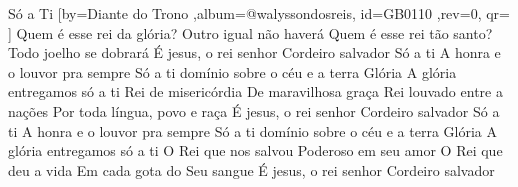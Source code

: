 \beginsong
{Só a Ti %
}[by={Diante do Trono %
},album={@walyssondosreis},
id={GB0110 %
},rev={0}, %
qr={ %
}]
\beginverse*
Quem é esse rei da glória?
Outro igual não haverá
Quem é esse rei tão santo?
Todo joelho se dobrará
É jesus, o rei senhor
Cordeiro salvador
\endverse
\beginchorus
Só a ti
A honra e o louvor pra sempre
Só a ti domínio sobre o céu e a terra
Glória
A glória entregamos só a ti
\endchorus
\beginverse*
Rei de misericórdia
De maravilhosa graça
Rei louvado entre a nações
Por toda língua, povo e raça
\endverse
\beginverse*
É jesus, o rei senhor
Cordeiro salvador
Só a ti
A honra e o louvor pra sempre
Só a ti domínio sobre o céu e a terra
Glória
A glória entregamos só a ti
\endverse
\beginverse*
O Rei que nos salvou
Poderoso em seu amor
O Rei que deu a vida
Em cada gota do Seu sangue
É jesus, o rei senhor
Cordeiro salvador
\endverse



